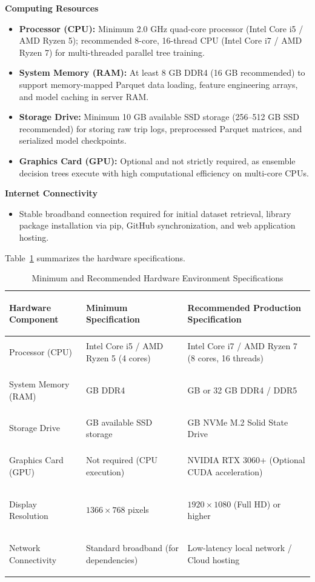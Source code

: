 \documentclass[12pt, a4paper]{article}
\renewcommand{\_}{\textunderscore\allowbreak}
\begin{document}
\noindent \textbf{Computing Resources}
\begin{itemize}
    \item \textbf{Processor (CPU):} Minimum 2.0 GHz quad-core processor (Intel Core i5 / AMD Ryzen 5); recommended 8-core, 16-thread CPU (Intel Core i7 / AMD Ryzen 7) for multi-threaded parallel tree training.
    \item \textbf{System Memory (RAM):} At least 8 GB DDR4 (16 GB recommended) to support memory-mapped Parquet data loading, feature engineering arrays, and model caching in server RAM.
    \item \textbf{Storage Drive:} Minimum 10 GB available SSD storage (256--512 GB SSD recommended) for storing raw trip logs, preprocessed Parquet matrices, and serialized model checkpoints.
    \item \textbf{Graphics Card (GPU):} Optional and not strictly required, as ensemble decision trees execute with high computational efficiency on multi-core CPUs.
\end{itemize}

\noindent \textbf{Internet Connectivity}
\begin{itemize}
    \item Stable broadband connection required for initial dataset retrieval, library package installation via pip, GitHub synchronization, and web application hosting.
\end{itemize}

Table~\ref{tab:hardware_env} summarizes the hardware specifications.

\begin{table}[H]
\centering
\small
\renewcommand{\arraystretch}{1.25}
\begin{tabularx}{\textwidth}{|>{\bfseries\raggedright\arraybackslash}p{3.0cm}|>{\raggedright\arraybackslash}p{3.8cm}|>{\raggedright\arraybackslash}X|}
\hline
\textbf{Hardware Component} & \textbf{Minimum Specification} & \textbf{Recommended Production Specification} \\ \hline
Processor (CPU) & Intel Core i5 / AMD Ryzen 5 (4 cores) & Intel Core i7 / AMD Ryzen 7 (8 cores, 16 threads) \\ \hline
System Memory (RAM) & 8 GB DDR4 & 16 GB or 32 GB DDR4 / DDR5 \\ \hline
Storage Drive & 10 GB available SSD storage & 25 GB NVMe M.2 Solid State Drive \\ \hline
Graphics Card (GPU) & Not required (CPU execution) & NVIDIA RTX 3060+ (Optional CUDA acceleration) \\ \hline
Display Resolution & $1366 \times 768$ pixels & $1920 \times 1080$ (Full HD) or higher \\ \hline
Network Connectivity & Standard broadband (for dependencies) & Low-latency local network / Cloud hosting \\ \hline
\end{tabularx}
\caption{Minimum and Recommended Hardware Environment Specifications}
\label{tab:hardware_env}
\end{table}
\end{document}
